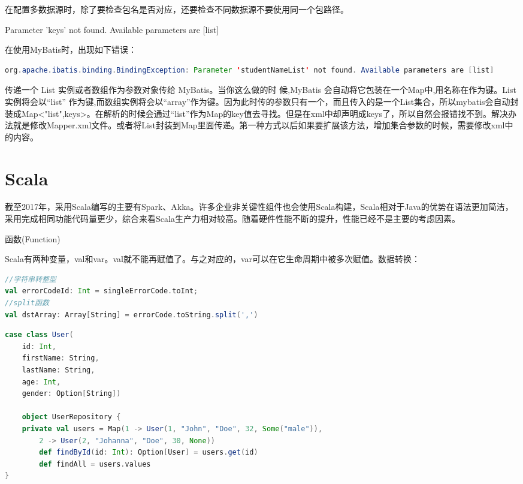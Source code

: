 \documentclass[12pt]{book}
\makeatletter
\numberwithin{dummy}{section}
\theoremstyle{ocrenumbox}
\theoremstyle{blacknumex}
\theoremstyle{blacknumbox}
\theoremstyle{ocrenum}
\renewcommand{\section}{\@startsection{section}{1}{\z@}
	{-4ex \@plus -1ex \@minus -.4ex}
	{1ex \@plus.2ex }
	{\normalfont\large\sffamily\bfseries}}
\renewcommand\paragraph{\@startsection{paragraph}{4}{\z@}
	{-2ex \@plus-.2ex \@minus .2ex}
	{.1ex}
	{\normalfont\small\sffamily\bfseries}}
\makeatother
\begin{document}
在配置多数据源时，除了要检查包名是否对应，还要检查不同数据源不要使用同一个包路径。

\paragraph{Parameter 'keys' not found. Available parameters are [list]}

在使用MyBatis时，出现如下错误：

\begin{lstlisting}[language=Java]
org.apache.ibatis.binding.BindingException: Parameter 'studentNameList' not found. Available parameters are [list]
\end{lstlisting}

传递一个 List 实例或者数组作为参数对象传给 MyBatis。当你这么做的时 候,MyBatis 会自动将它包装在一个Map中,用名称在作为键。List 实例将会以“list” 作为键,而数组实例将会以“array”作为键。因为此时传的参数只有一个，而且传入的是一个List集合，所以mybatis会自动封装成Map<"list",keys>。在解析的时候会通过“list”作为Map的key值去寻找。但是在xml中却声明成keys了，所以自然会报错找不到。解决办法就是修改Mapper.xml文件。或者将List封装到Map里面传递。第一种方式以后如果要扩展该方法，增加集合参数的时候，需要修改xml中的内容。

\newpage

\chapter{Scala}

截至2017年，采用Scala编写的主要有Spark、Akka。许多企业非关键性组件也会使用Scala构建，Scala相对于Java的优势在语法更加简洁，采用完成相同功能代码量更少，综合来看Scala生产力相对较高。随着硬件性能不断的提升，性能已经不是主要的考虑因素。

\section{函数(Function)}

Scala有两种变量，val和var。val就不能再赋值了。与之对应的，var可以在它生命周期中被多次赋值。数据转换：

\begin{lstlisting}[language=Scala]
//字符串转整型
val errorCodeId: Int = singleErrorCode.toInt;
//split函数
val dstArray: Array[String] = errorCode.toString.split(',')
\end{lstlisting}


\begin{lstlisting}[language=Scala]
case class User(  
	id: Int,  
	firstName: String,  
	lastName: String,  
	age: Int,  
	gender: Option[String])  
	
	object UserRepository {  
	private val users = Map(1 -> User(1, "John", "Doe", 32, Some("male")),  
		2 -> User(2, "Johanna", "Doe", 30, None))  
		def findById(id: Int): Option[User] = users.get(id)  
		def findAll = users.values  
}  
\end{lstlisting}
\end{document}
